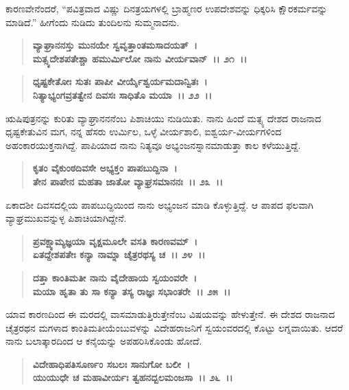 ಕಾರಣವೇನೆಂದರೆ, “ಪವಿತ್ರವಾದ ವಿಷ್ಣು ದಿನತ್ರಯಗಳಲ್ಲಿ ಬ್ರಾಹ್ಮಣರ ಉಪದೇಶವನ್ನು ಧಿಕ್ಕರಿಸಿ ಕ್ಷೌರಕರ್ಮವನ್ನು ಮಾಡಿದೆ.” ಹೀಗೆಂದು ನುಡಿದು ತುಂದಿಲನು ಸುಮ್ಮನಾದನು.

\begin{verse}
\textbf{ವ್ಯಾಘ್ರಾನನಸ್ತು ಮುನಯೇ ಸ್ವವೃತ್ತಾಂತಮಸಾದಯತ್~।}\\\textbf{ಮತ್ಸ್ಯದೇಶಪತೇಶ್ಚಾ ಹಮುರ್ಮಿಲೋ ನಾನು ವೀರ್ಯವಾನ್~।। ೨೧~।। }
\end{verse}

\begin{verse}
\textbf{ಧೃಷ್ಟಕೇತೋಃ ಸುತಃ ಪಾಪೀ ವೀರ್ಯೈಶ್ವರ್ಯಮದಾನ್ವಿತಃ~।}\\\textbf{ನಿತ್ಯಾಭ್ಯಂಗವ್ರತತ್ವೇನ ದಿವಸಃ ಸಾಧಿತೊ ಮಯಾ~।। ೨೨~।। }
\end{verse}

ಋಷಿಪುತ್ರನನ್ನು ಕುರಿತು ವ್ಯಾಘ್ರಾನನನೆಂಬ ಪಿಶಾಚಿಯು ನುಡಿಯಿತು. ನಾನು ಹಿಂದೆ ಮತ್ಸ್ಯ ದೇಶದ ರಾಜನಾದ ಧೃಷ್ಟಕೇತುವಿನ ಮಗ, ನನ್ನ ಹೆಸರು ಉರ್ಮಿಲ, ಒಳ್ಳೆ ವೀರ್ಯಶಾಲಿ, ಐಶ್ವರ್ಯ-ವೀರ್ಯಗಳಿಂದ ಅಹಂಕಾರಯುಕ್ತನಾಗಿದ್ದೆ. ಪಾಪಿಯಾದ ನಾನು ನಿತ್ಯವೂ ಅಭ್ಯಂಜನಸ್ನಾನಮಾಡುತ್ತಾ ಕಾಲ ಕಳೆಯುತ್ತಿದ್ದೆ.

\begin{verse}
\textbf{ಕೃತಂ ವೈಕುಂಠದಿವಸೇ ಅಭ್ಯಕ್ತಂ ಪಾಪಬುದ್ದಿನಾ~।}\\\textbf{ತೇನ ಪಾಪೇನ ಮಹತಾ ಜಾತೋ ವ್ಯಾಘ್ರಸಮಾನನಃ~।। ೨೩~।। }
\end{verse}

ಏಕಾದಶೀ ದಿವಸದಲ್ಲಿಯ ಪಾಪಬುದ್ದಿಯಿಂದ ನಾನು ಅಭ್ಯಂಜನ ಮಾಡಿ ಕೊಳ್ಳುತ್ತಿದ್ದೆ. ಆ ಪಾಪದ ಫಲವಾಗಿ ವ್ಯಾಘ್ರಮುಖವನ್ನುಳ್ಳ ಪಿಶಾಚಿಯಾಗಿದ್ದೇನೆ.

\begin{verse}
\textbf{ಪ್ರವಕ್ಷ್ಯಾಮ್ಯಜ್ಞಯಾ ವೃಕ್ಷಮೂಲೇ ವಸತಿ ಕಾರಣವಮ್~।}\\\textbf{ಏತದ್ದೇಶಪತೇಃ ಕನ್ಯಾ ನಾಮ್ನಾ ಚೈತ್ರರಥಸ್ಯ ಚ~।। ೨೪~।।} 
\end{verse}

\begin{verse}
\textbf{ದತ್ತಾ ಕಾಂತಿಮತೀ ನಾನು ವೈದೇಹಾಯ ಸ್ವಯಂವರೇ~।}\\\textbf{ಮಯಾ ಹೃತಾ ತು ಸಾ ಕನ್ಯಾ ತಸ್ಯ ರಾಜ್ಞಃ ಸಭಾಂತರೇ~।। ೨೫~।। }
\end{verse}

ಯಾವ ಕಾರಣದಿಂದ ಈ ಮರದಲ್ಲಿ ವಾಸಮಾಡುತ್ತಿರುತ್ತೇನೆಂಬ ವಿಷಯವನ್ನು ಹೇಳು\-ತ್ತೇನೆ. ಈ ದೇಶದ ರಾಜನಾದ ಚೈತ್ರರಥನ ಮಗಳಾದ ಕಾಂತಿಮತೀಯೆಂಬುವಳನ್ನು ವಿದೇಹರಾಜನಿಗೆ ಸ್ವಯಂವರದಲ್ಲಿ ಕೊಟ್ಟು ಲಗ್ನವಾಯಿತು. ಆದರೆ ನಾನು ಬಲಾತ್ಕಾರದಿಂದ ಆ ಕನೈಯನ್ನು ಅಪಹರಿಸಿಕೊಂಡು ಹೋದೆ.

\begin{verse}
\textbf{ವಿದೇಹಾಧಿಪತಿಸೂರ್ಣಂ ಸಬಲಃ ಸಾನುಗೋ ಬಲೀ~।}\\\textbf{ಯುಯುಧೇ ಚ ಮಹಾವೀರ್ಯಃ ತ್ವಹನದ್ಬಲಮಂಜಸಾ~।। ೨೬~।।}
\end{verse}

